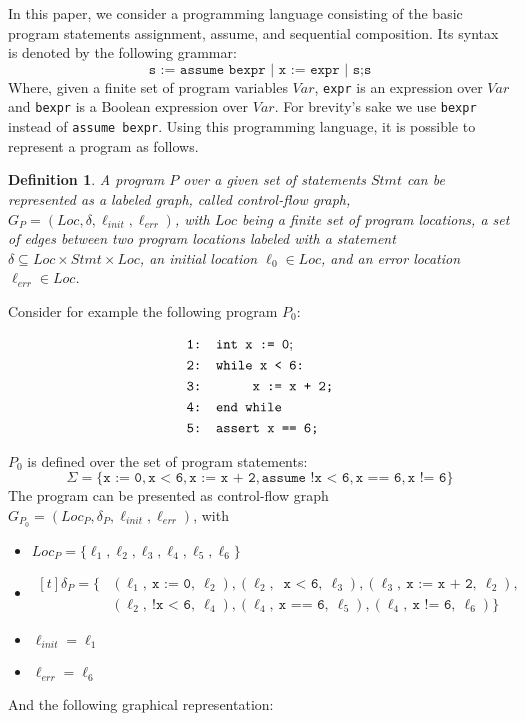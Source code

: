 \documentclass{article}
\newtheorem{mydef}{Definition}
\begin{document}
In this paper, we consider a programming language consisting of the basic program statements assignment, assume, and sequential composition. Its syntax is denoted by the following grammar:
\begin{equation*}
	\texttt{s := assume bexpr | x := expr | s;s}
\end{equation*}
Where, given a finite set of program variables $Var$, \texttt{expr} is an expression over $Var$ and \texttt{bexpr} is a Boolean expression over $Var$. For brevity's sake we use \texttt{bexpr} instead of \texttt{assume bexpr}.
Using this programming language, it is possible to represent a program as follows.
\begin{mydef}
	A program $P$ over a given set of statements $Stmt$ can be represented as a labeled graph, called control-flow graph, $G_P = (Loc, \delta, \ell_{init}, \ell_{err})$, with $Loc$ being a finite set of program locations, a set of edges between two program locations labeled with a statement $\delta \subseteq Loc \times Stmt \times Loc$, an initial location $\ell_0 \in Loc$, and an error location $\ell_{err} \in Loc$.
\end{mydef}

Consider for example the following program $P_0$:
\begin{figure}[H]
	\begin{align*}
		&\texttt{1: int x := 0}; \\
		&\texttt{2: while x < 6:} \\
		&\texttt{3: \hspace*{2em} x := x + 2;} \\
		&\texttt{4: end while} \\
		&\texttt{5: assert x == 6;}
	\end{align*}
	\label{fig:square}
\end{figure}

$P_0$ is defined over the set of program statements: 
\begin{equation*}
	\Sigma = \{ \texttt{x := 0},\texttt{x < 6}, \texttt{x := x + 2}, \texttt{assume !x < 6}, \texttt{x == 6}, \texttt{x != 6} \}
\end{equation*} 
The program can be presented as control-flow graph $G_{P_0} = (Loc_P, \delta_P, \ell_{init}, \ell_{err})$, with 
\begin{itemize}
	\item $Loc_P = \{ \ell_1, \ell_2, \ell_3, \ell_4, \ell_5, \ell_6 \}$
	\item $\begin{aligned}[t]	\delta_P = \{ &(\ell_1,\ \texttt{x := 0},\ \ell_2), (\ell_2,\ \texttt{ x < 6},\ \ell_3), (\ell_3,\ \texttt{x := x + 2},\ \ell_2), \\ &(\ell_2,\ \texttt{!x < 6},\ \ell_4), (\ell_4,\ \texttt{x == 6},\ \ell_5), (\ell_4,\ \texttt{x != 6},\ \ell_6)\} \end{aligned}$
	\item  $\ell_{init} = \ell_1$
	\item $\ell_{err} = \ell_6$
\end{itemize}
And the following graphical representation: 
\end{document}

